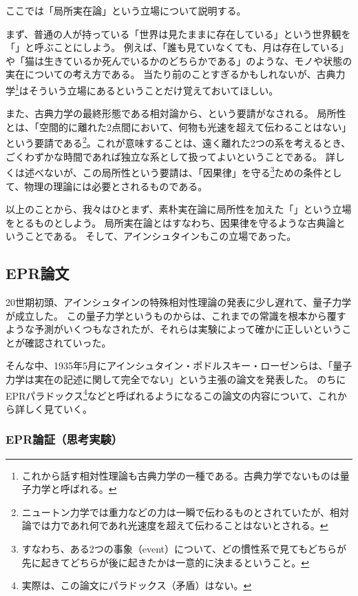 \documentclass[10pt,b5paper,papersize,dvipdfmx]{jsbook}
\begin{document}
ここでは「局所実在論」という立場について説明する。
\par
まず、普通の人が持っている「世界は見たままに存在している」という世界観を「」と呼ぶことにしよう。
例えば、「誰も見ていなくても、月は存在している」や「猫は生きているか死んでいるかのどちらかである」のような、モノや状態の実在についての考え方である。
当たり前のことすぎるかもしれないが、古典力学\footnote{
  これから話す相対性理論も古典力学の一種である。古典力学でないものは量子力学と呼ばれる。
}はそういう立場にあるということだけ覚えておいてほしい。
\par
また、古典力学の最終形態である相対論から、という要請がなされる。
局所性とは、「空間的に離れた2点間において、何物も光速を超えて伝わることはない」という要請である\footnote{
  ニュートン力学では重力などの力は一瞬で伝わるものとされていたが、相対論では力であれ何であれ光速度を超えて伝わることはないとされる。
}。これが意味することは、遠く離れた2つの系を考えるとき、ごくわずかな時間であれば独立な系として扱ってよいということである。
詳しくは述べないが、この局所性という要請は、「因果律」を守る\footnote{
  すなわち、ある2つの事象（event）について、どの慣性系で見てもどちらが先に起きてどちらが後に起きたかは一意的に決まるということ。
}ための条件として、物理の理論には必要とされるものである。
\par
以上のことから、我々はひとまず、素朴実在論に局所性を加えた「」という立場をとるものとしよう。
局所実在論とはすなわち、因果律を守るような古典論ということである。
そして、アインシュタインもこの立場であった。


%
\subsection{EPR論文} %
%

20世期初頭、アインシュタインの特殊相対性理論の発表に少し遅れて、量子力学が成立した。
この量子力学というものからは、これまでの常識を根本から覆すような予測がいくつもなされたが、それらは実験によって確かに正しいということが確認されていった。
\par
そんな中、1935年5月にアインシュタイン・ポドルスキー・ローゼンらは、「量子力学は実在の記述に関して完全でない」という主張の論文を発表した。
のちにEPRパラドックス\footnote{
  実際は、この論文にパラドックス（矛盾）はない。
}などと呼ばれるようになるこの論文の内容について、これから詳しく見ていく。

%
\subsubsection{EPR論証（思考実験）} %
\end{document}
